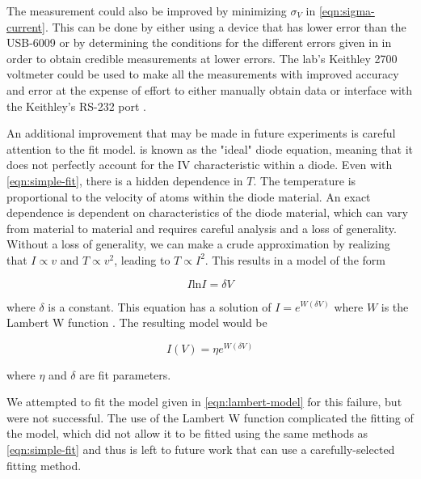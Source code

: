 \documentclass[reprint]{revtex4-1}
\begin{document}
The measurement could also be improved by minimizing $\sigma_V$ in \cref{eqn:sigma-current}. This can be done by either using a device that has lower error than the USB-6009 or by determining the conditions for the different errors given in \cite{Instruments2014} in order to obtain credible measurements at lower errors. The lab's Keithley 2700 voltmeter could be used to make all the measurements with improved accuracy and error at the expense of effort to either manually obtain data or interface with the Keithley's RS-232 port \cite{Keithley2003}.

An additional improvement that may be made in future experiments is careful attention to the fit model.  is known as the "ideal" diode equation, meaning that it does not perfectly account for the IV characteristic within a diode. Even with \cref{eqn:simple-fit}, there is a hidden dependence in $T$. The temperature is proportional to the velocity of atoms within the diode material. An exact dependence is dependent on characteristics of the diode material, which can vary from material to material and requires careful analysis and a loss of generality. Without a loss of generality, we can make a crude approximation by realizing that $I \propto v$ and $T \propto v^2$, leading to $T \propto I^2$. This results in a model of the form

\begin{equation}
I \mathrm{ln} I = \delta V 
\end{equation}

where $\delta$ is a constant. This equation has a solution of $I = e^{W\left(\delta V \right)}$ where $W$ is the Lambert W function \cite{lambertW}. The resulting model would be

\begin{equation}
I(V) = \eta e^{W \left(\delta V\right)}
\label{eqn:lambert-model}
\end{equation}

where $\eta$ and $\delta$ are fit parameters.

We attempted to fit the model given in \cref{eqn:lambert-model} for this failure, but were not successful. The use of the Lambert W function complicated the fitting of the model, which did not allow it to be fitted using the same methods as \cref{eqn:simple-fit} and thus is left to future work that can use a carefully-selected fitting method.



\end{document}
